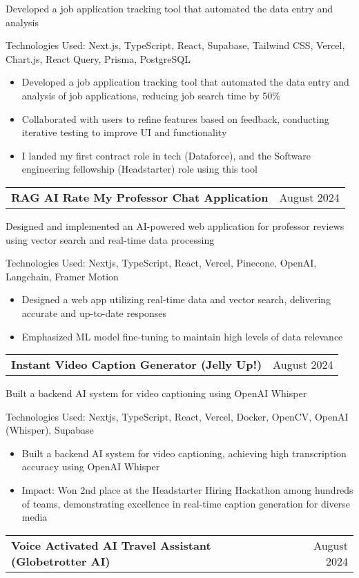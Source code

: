\documentclass[letterpaper,11pt]{article}
\makeatletter
\newcommand{\resumeItem}[1]{\item\small{{#1 \vspace{-2pt}}}}
\newcommand{\resumeProjectHeader}[2]{
  \vspace{-2pt}
  \item[]
    \begin{tabular*}{0.97\textwidth}[t]{l@{\extracolsep{\fill}}r}
      \textbf{#1} & #2 \\
    \end{tabular*}\vspace{-7pt}
}
\newcommand{\resumeProjectDetails}[1]{
  \vspace{3pt}
  \begin{minipage}[t]{0.97\textwidth}
    \small #1
  \end{minipage}
}
\newcommand{\resumeItemListStart}{\begin{itemize}}
\newcommand{\resumeItemListEnd}{\end{itemize}\vspace{-5pt}}
\makeatother
\begin{document}
     \resumeProjectDetails{Developed a job application tracking tool that automated the data entry and analysis}
     \resumeItem{Technologies Used: Next.js, TypeScript, React, Supabase, Tailwind CSS, Vercel, Chart.js, React Query, Prisma, PostgreSQL}
     \resumeItemListStart
         \resumeItem{Developed a job application tracking tool that automated the data entry and analysis of job applications, reducing job search time by 50\%}
          \resumeItem{Collaborated with users to refine features based on feedback, conducting iterative testing to improve UI and functionality}
          \resumeItem{I landed my first contract role in tech (Dataforce), and the Software engineering fellowship (Headstarter) role using this tool}
       \resumeItemListEnd
   

     \resumeProjectHeader
       {RAG AI Rate My Professor Chat Application}{August 2024}
     
     \resumeProjectDetails{Designed and implemented an AI-powered web application for professor reviews using vector search and real-time data processing}
     \resumeItem{Technologies Used: Nextjs, TypeScript, React, Vercel, Pinecone, OpenAI, Langchain, Framer Motion}
     \resumeItemListStart
         \resumeItem{Designed a web app utilizing real-time data and vector search, delivering accurate and up-to-date responses}
          \resumeItem{Emphasized ML model fine-tuning to maintain high levels of data relevance}
       \resumeItemListEnd
   

     \resumeProjectHeader
       {Instant Video Caption Generator (Jelly Up!)}{August 2024}
     
     \resumeProjectDetails{Built a backend AI system for video captioning using OpenAI Whisper}
     \resumeItem{Technologies Used: Nextjs, TypeScript, React, Vercel, Docker, OpenCV, OpenAI (Whisper), Supabase}
     \resumeItemListStart
         \resumeItem{Built a backend AI system for video captioning, achieving high transcription accuracy using OpenAI Whisper}
          \resumeItem{Impact: Won 2nd place at the Headstarter Hiring Hackathon among hundreds of teams, demonstrating excellence in real-time caption generation for diverse media}
       \resumeItemListEnd
   

     \resumeProjectHeader
       {Voice Activated AI Travel Assistant (Globetrotter AI)}{August 2024}
     
\end{document}
